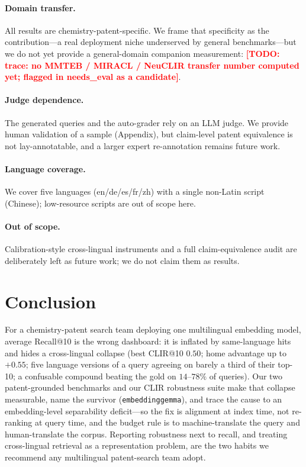\documentclass[11pt]{article}
\newcommand{\todo}[1]{\textcolor{red}{\textbf{[TODO: #1]}}}
\begin{document}
\paragraph{Domain transfer.}
All results are chemistry-patent-specific. We frame that specificity as the
contribution---a real deployment niche underserved by general benchmarks---but
we do not yet provide a general-domain companion measurement:
\todo{trace: no MMTEB / MIRACL / NeuCLIR transfer number computed yet;
flagged in needs\_eval as a candidate}.

\paragraph{Judge dependence.}
The generated queries and the auto-grader rely on an LLM judge. We provide human
validation of a sample (Appendix), but claim-level patent equivalence is not
lay-annotatable, and a larger expert re-annotation remains future work.

\paragraph{Language coverage.}
We cover five languages (en/de/es/fr/zh) with a single non-Latin script
(Chinese); low-resource scripts are out of scope here.

\paragraph{Out of scope.}
Calibration-style cross-lingual instruments and a full claim-equivalence audit
are deliberately left as future work; we do not claim them as results.

\section{Conclusion}

For a chemistry-patent search team deploying one multilingual embedding model,
average Recall@10 is the wrong dashboard: it is inflated by same-language hits
and hides a cross-lingual collapse (best CLIR@10 $0.50$; home advantage up to
$+0.55$; five language versions of a query agreeing on barely a third of their
top-10; a confusable compound beating the gold on $14$--$78\%$ of queries). Our
two patent-grounded benchmarks and our CLIR robustness suite make that collapse
measurable, name the survivor (\texttt{embeddinggemma}), and trace the cause to
an embedding-level separability deficit---so the fix is alignment at index time,
not re-ranking at query time, and the budget rule is to machine-translate the
query and human-translate the corpus. Reporting robustness next to recall, and
treating cross-lingual retrieval as a representation problem, are the two habits
we recommend any multilingual patent-search team adopt.
\end{document}
